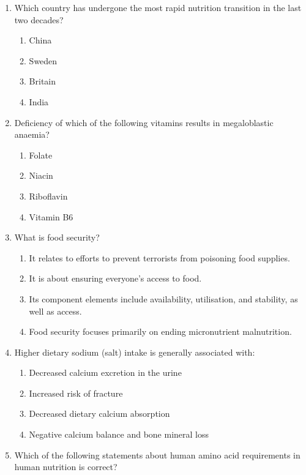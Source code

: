 \documentclass[12pt]{article}
\begin{document}
\begin{enumerate}[label=\arabic*.]
\begin{enumerate}[label=(\alph*)]
    \item Red blood cells can only metabolise glucose by anaerobic glycolysis and the pentose phosphate pathway.
\end{enumerate}
\item Which country has undergone the most rapid nutrition transition in the last two decades?
\begin{enumerate}[label=(\alph*)]
    \item China
    \item Sweden
    \item Britain
    \item India
\end{enumerate}
\item Deficiency of which of the following vitamins results in megaloblastic anaemia?
\begin{enumerate}[label=(\alph*)]
    \item Folate
    \item Niacin
    \item Riboflavin
    \item Vitamin B6
\end{enumerate}
\item What is food security?
\begin{enumerate}[label=(\alph*)]
    \item It relates to efforts to prevent terrorists from poisoning food supplies.
    \item It is about ensuring everyone's access to food.
    \item Its component elements include availability, utilisation, and stability, as well as access.
    \item Food security focuses primarily on ending micronutrient malnutrition.
\end{enumerate}
\item Higher dietary sodium (salt) intake is generally associated with:
\begin{enumerate}[label=(\alph*)]
    \item Decreased calcium excretion in the urine
    \item Increased risk of fracture
    \item Decreased dietary calcium absorption
    \item Negative calcium balance and bone mineral loss
\end{enumerate}
\item Which of the following statements about human amino acid requirements in human nutrition is correct?

\end{enumerate}
\end{document}
